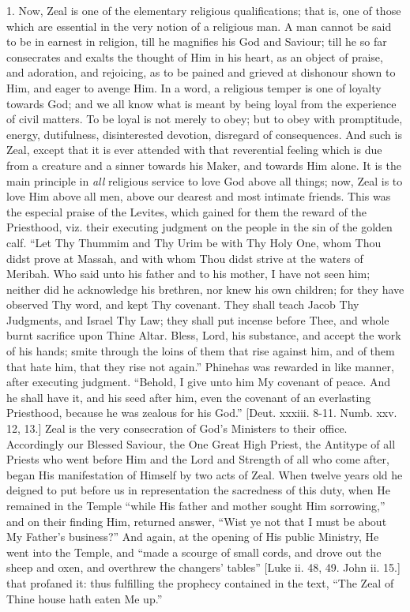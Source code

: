 1. Now, Zeal is one of the elementary religious qualifications; that
is, one of those which are essential in the very notion of a religious
man. A man cannot be said to be in earnest in religion, till he
magnifies his God and Saviour; till he so far consecrates and exalts the
thought of Him in his heart, as an object of praise, and adoration, and
rejoicing, as to be pained and grieved at dishonour shown to Him, and
eager to avenge Him. In a word, a religious temper is one of loyalty
towards God; and we all know what is meant by being loyal from the
experience of civil matters. To be loyal is not merely to obey; but to
obey with promptitude, energy, dutifulness, disinterested devotion,
disregard of consequences. And such is Zeal, except that it is ever
attended with that reverential feeling which is due from a creature and
a sinner towards his Maker, and towards Him alone. It is the main
principle in \emph{all} religious service to love God above all things;
now, Zeal is to love Him above all men, above our dearest and most
intimate friends. This was the especial praise of the Levites, which
gained for them the reward of the Priesthood, viz. their executing
judgment on the people in the sin of the golden calf. ``Let Thy
Thummim and Thy Urim be with Thy Holy One, whom Thou didst prove at
Massah, and with whom Thou didst strive at the waters of Meribah. Who
said unto his father and to his mother, I have not seen him; neither did
he acknowledge his brethren, nor knew his own children; for they have
observed Thy word, and kept Thy covenant. They shall teach Jacob Thy
Judgments, and Israel Thy Law; they shall put incense before Thee, and
whole burnt sacrifice upon Thine Altar. Bless, Lord, his substance, and
accept the work of his hands; smite through the loins of them that rise
against him, and of them that hate him, that they rise not again.''
Phinehas was rewarded in like manner, after executing judgment.
``Behold, I give unto him My covenant of peace. And he shall have
it, and his seed after him, even the covenant of an everlasting
Priesthood, because he was zealous for his God.'' [Deut. xxxiii.
8-11. Numb. xxv. 12, 13.] Zeal is the very consecration of God's
Ministers to their office. Accordingly our Blessed Saviour, the One
Great High Priest, the Antitype of all Priests who went before Him and
the Lord and Strength of all who come after, began His manifestation of
Himself by two acts of Zeal. When twelve years old he deigned to put
before us in representation the sacredness of this duty, when He
remained in the Temple ``while His father and mother sought Him
sorrowing,'' and on their finding Him, returned answer, ``Wist
ye not that I must be about My Father's business?'' And again, at
the opening of His public Ministry, He went into the Temple, and
``made a scourge of small cords, and drove out the sheep and oxen,
and overthrew the changers' tables'' [Luke ii. 48, 49. John ii.
15.] that profaned it: thus fulfilling the prophecy contained in the
text, ``The Zeal of Thine house hath eaten Me up.''


